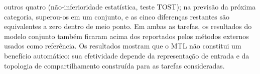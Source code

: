\begin{resumo}[Resumo]
        outros quatro (não-inferioridade estatística, teste TOST); na previsão da próxima categoria, superou-os em um conjunto, e as cinco
        diferenças restantes são equivalentes a zero dentro de meio ponto. Em ambas as tarefas,
        os resultados do modelo conjunto também
        ficaram acima dos reportados pelos métodos externos usados como referência.
        Os resultados mostram que o MTL não constitui um benefício automático: sua efetividade depende da representação de entrada e da topologia de compartilhamento construída para as tarefas consideradas.


\end{resumo}
